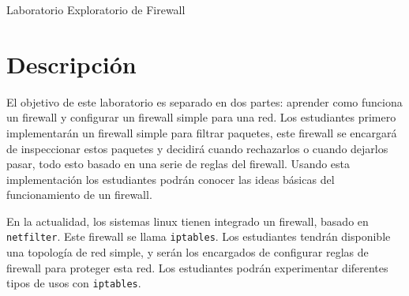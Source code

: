 
\newcommand{\commonfolder}{../../common-files}




\newcommand{\telnet} {\texttt{telnet}\xspace}
\newcommand{\iptables}{\texttt{iptables}\xspace}
\newcommand{\netfilter}{\texttt{netfilter}\xspace}
\newcommand{\Netfilter}{\texttt{Netfilter}\xspace}

\newcommand{\firewallFigs}{./Figs}

\newcommand{\pointleft}[1]{\reflectbox{\ding{217}} \textbf{\texttt{#1}}}



\begin{center}
{\LARGE Laboratorio Exploratorio de Firewall}
\end{center}




\section{Descripción}

El objetivo de este laboratorio es separado en dos partes: aprender como funciona un firewall y configurar un firewall simple para una red. Los estudiantes primero implementarán un firewall simple para filtrar paquetes, este firewall se encargará de inspeccionar estos paquetes y decidirá cuando rechazarlos o cuando dejarlos pasar, todo esto basado en una serie de reglas del firewall.
Usando esta implementación los estudiantes podrán conocer las ideas básicas del funcionamiento de un firewall.

En la actualidad, los sistemas linux tienen integrado un firewall, basado en \texttt{netfilter}. Este firewall se llama \iptables. 
Los estudiantes tendrán disponible una topología de red simple, y serán los encargados de configurar reglas de firewall para proteger esta red.
Los estudiantes podrán experimentar diferentes tipos de usos con \iptables. 

